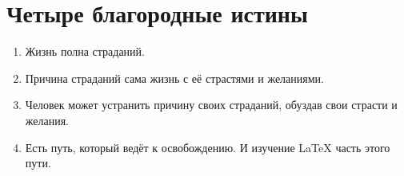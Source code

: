 \documentclass[12pt, a4paper]{article}  %
\begin{document}

\section*{Четыре благородные истины}

\begin{enumerate}
\item Жизнь полна страданий.
\item Причина страданий сама жизнь с её страстями и желаниями.
\item Человек может устранить причину своих страданий, обуздав свои страсти и желания.
\item Есть путь, который ведёт к освобождению. И изучение \LaTeX{ } часть этого пути.
\end{enumerate}
\end{document}
